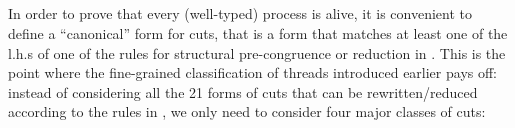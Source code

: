 \begin{code}[hide]
\AgdaSymbol{)}\<%
\\
%
\\[\AgdaEmptyExtraSkip]%
\>[0]\AgdaSpace{}%
\AgdaSymbol{:}\AgdaSpace{}%
\AgdaSpace{}%
\AgdaSpace{}%
\AgdaSpace{}%
\AgdaSymbol{\}}\AgdaSpace{}%
\AgdaSymbol{(}\AgdaSpace{}%
\AgdaSymbol{:}\AgdaSpace{}%
\AgdaSpace{}%
\AgdaSpace{}%
\AgdaOperator{\AgdaFunction{[}}\AgdaSpace{}%
\AgdaSpace{}%
\AgdaSpace{}%
\AgdaOperator{\AgdaFunction{]}}\AgdaSpace{}%
\AgdaOperator{\AgdaDatatype{+}}\AgdaSpace{}%
\AgdaSymbol{)}\AgdaSpace{}%
\AgdaSpace{}%
\AgdaSpace{}%
\AgdaSymbol{(}\AgdaSpace{}%
\AgdaSymbol{(}\AgdaSpace{}%
\AgdaSpace{}%
\AgdaSpace{}%
\AgdaSpace{}%
\AgdaSymbol{))}\<%
\\
\>[0]\AgdaSpace{}%
\AgdaSymbol{(}\AgdaOperator{\AgdaInductiveConstructor{<}}\AgdaSpace{}%
\AgdaSymbol{)}\AgdaSpace{}%
\AgdaSymbol{=}\AgdaSpace{}%
\AgdaSpace{}%
\AgdaSymbol{(}\AgdaSpace{}%
\AgdaSymbol{)}\<%
\\
\>[0]\AgdaSpace{}%
\AgdaSymbol{(}\AgdaOperator{\AgdaInductiveConstructor{>}}\AgdaSpace{}%
\AgdaSymbol{)}\AgdaSpace{}%
\AgdaSymbol{=}\AgdaSpace{}%
\AgdaSpace{}%
\AgdaSymbol{(}\AgdaSpace{}%
\AgdaSymbol{)}\<%
\end{code}

In order to prove that every (well-typed) process is alive, it is convenient to
define a ``canonical'' form for cuts, that is a form that matches at least one
of the l.h.s of one of the rules for structural pre-congruence or reduction in
. This is the point where the fine-grained classification of
threads introduced earlier pays off: instead of considering all the 21 forms of
cuts that can be rewritten/reduced according to the rules in
, we only need to consider four major classes of cuts:


